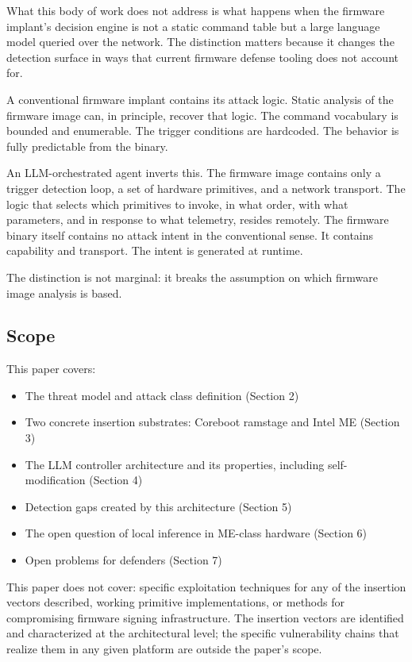 \documentclass[11pt,a4paper]{article}
\begin{document}
What this body of work does not address is what happens when the firmware implant's decision engine is not a static command table but a large language model queried over the network. The distinction matters because it changes the detection surface in ways that current firmware defense tooling does not account for.

A conventional firmware implant contains its attack logic. Static analysis of the firmware image can, in principle, recover that logic. The command vocabulary is bounded and enumerable. The trigger conditions are hardcoded. The behavior is fully predictable from the binary.

An LLM-orchestrated agent inverts this. The firmware image contains only a trigger detection loop, a set of hardware primitives, and a network transport. The logic that selects which primitives to invoke, in what order, with what parameters, and in response to what telemetry, resides remotely. The firmware binary itself contains no attack intent in the conventional sense. It contains capability and transport. The intent is generated at runtime.

The distinction is not marginal: it breaks the assumption on which firmware image analysis is based.

\subsection{Scope}

This paper covers:

\begin{itemize}[noitemsep]
\item The threat model and attack class definition (Section 2)
\item Two concrete insertion substrates: Coreboot ramstage and Intel ME (Section 3)
\item The LLM controller architecture and its properties, including self-modification (Section 4)
\item Detection gaps created by this architecture (Section 5)
\item The open question of local inference in ME-class hardware (Section 6)
\item Open problems for defenders (Section 7)
\end{itemize}

This paper does not cover: specific exploitation techniques for any of the insertion vectors described, working primitive implementations, or methods for compromising firmware signing infrastructure. The insertion vectors are identified and characterized at the architectural level; the specific vulnerability chains that realize them in any given platform are outside the paper's scope.
\end{document}
